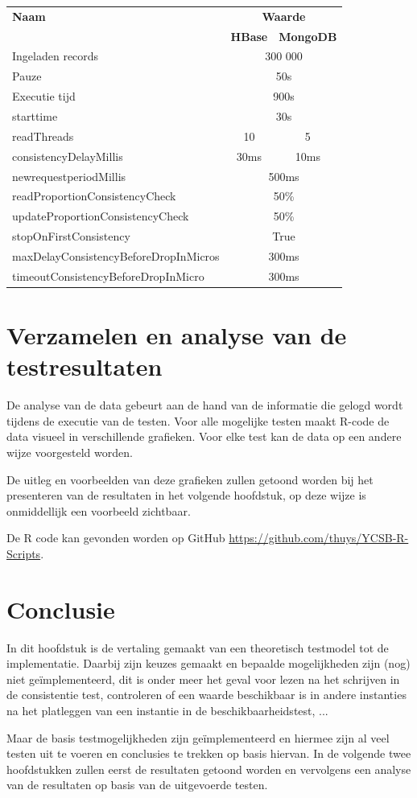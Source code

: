 \begin{table}[htb!]
	\centering
		\begin{tabular}{l|c c }
			\textbf{Naam} & \multicolumn{2}{c}{\textbf{Waarde}} \\ 
		 	 & \textbf{HBase} & \textbf{MongoDB} \\ \hline
			Ingeladen records  & \multicolumn{2}{c}{300 000} \\
			Pauze & \multicolumn{2}{c}{50s} \\
			Executie tijd & \multicolumn{2}{c}{900s} \\	
			starttime & \multicolumn{2}{c}{30s} \\
			readThreads & 10 & 5\\ 
			consistencyDelayMillis & 30ms & 10ms\\ 
			newrequestperiodMillis & \multicolumn{2}{c}{500ms} \\ 
			readProportionConsistencyCheck & \multicolumn{2}{c}{50\%} \\ 
			updateProportionConsistencyCheck & \multicolumn{2}{c}{50\%} \\ 
			stopOnFirstConsistency & \multicolumn{2}{c}{True} \\ 
			maxDelayConsistencyBeforeDropInMicros & \multicolumn{2}{c}{300ms} \\ 
			timeoutConsistencyBeforeDropInMicro & \multicolumn{2}{c}{300ms} \\
		\end{tabular} 
	\label{table:consistentie-testen-parameters}
\end{table}

\section{Verzamelen en analyse van de testresultaten}
De analyse van de data gebeurt aan de hand van de informatie die gelogd wordt tijdens de executie van de testen. Voor alle mogelijke testen maakt R-code de data visueel in verschillende grafieken. Voor elke test kan de data op een andere wijze voorgesteld worden. 

De uitleg en voorbeelden van deze grafieken zullen getoond worden bij het presenteren van de resultaten in het volgende hoofdstuk, op deze wijze is onmiddellijk een voorbeeld zichtbaar. 

De R code kan gevonden worden op GitHub \url{https://github.com/thuys/YCSB-R-Scripts}.  

\section{Conclusie}
In dit hoofdstuk is de vertaling gemaakt van een theoretisch testmodel tot de implementatie. Daarbij zijn keuzes gemaakt en bepaalde mogelijkheden zijn (nog) niet geïmplementeerd, dit is onder meer het geval voor lezen na het schrijven in de consistentie test, controleren of een waarde beschikbaar is in andere instanties na het platleggen van een instantie in de beschikbaarheidstest, ...

Maar de basis testmogelijkheden zijn geïmplementeerd en hiermee zijn al veel testen uit te voeren en conclusies te trekken op basis hiervan. In de volgende twee hoofdstukken zullen eerst de resultaten getoond worden en vervolgens een analyse van de resultaten op basis van de uitgevoerde testen.

